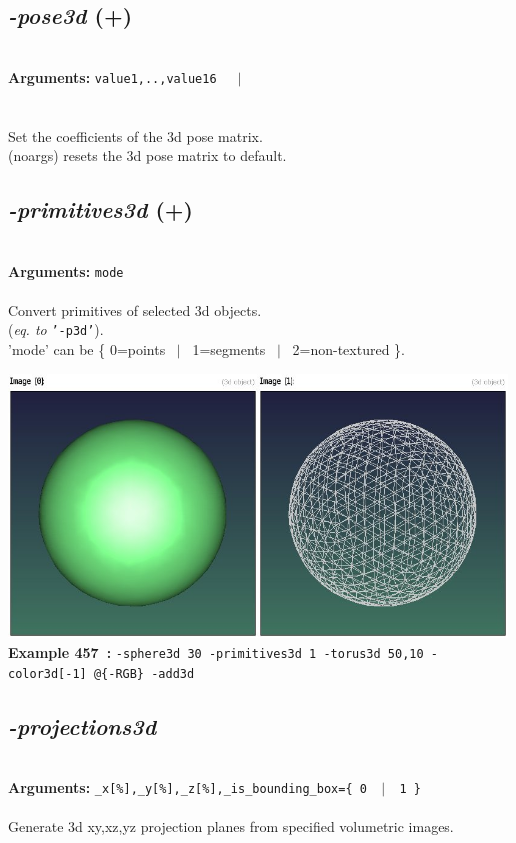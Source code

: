 \documentclass[a4paper,11pt,twoside]{book}
\begin{document}
\subsection{\emph{-pose3d} (+)}\vspace*{-0.5em}
~\\\textbf{Arguments: } 
{\small \texttt{value1,..,value16}}~~~$|$\\
\\~\\
Set the coefficients of the 3d pose matrix.
~\\(noargs) resets the 3d pose matrix to default.


\subsection{\emph{-primitives3d} (+)}\vspace*{-0.5em}
~\\\textbf{Arguments: } 
{\small \texttt{mode}}\\~\\
Convert primitives of selected 3d objects.
~\\(\emph{eq. to} {\small \texttt{'-p3d'}}).
~\\'mode' can be \{ 0=points ~$|$~ 1=segments ~$|$~ 2=non-textured \}.
\begin{center}\includegraphics[keepaspectratio=true,height=7cm,width=\textwidth]{img/gmic_def457.jpg}\\
{\footnotesize \textbf{Example 457~:} \texttt{-sphere3d 30 -primitives3d 1 -torus3d 50,10 -color3d[-1] @\{-RGB\} -add3d}}
\end{center}

\subsection{\emph{-projections3d} }\vspace*{-0.5em}
~\\\textbf{Arguments: } 
{\small \texttt{\_x[\%],\_y[\%],\_z[\%],\_is\_bounding\_box=\{ 0 ~$|$~ 1 \}}}\\~\\
Generate 3d xy,xz,yz projection planes from specified volumetric images.
\end{document}
